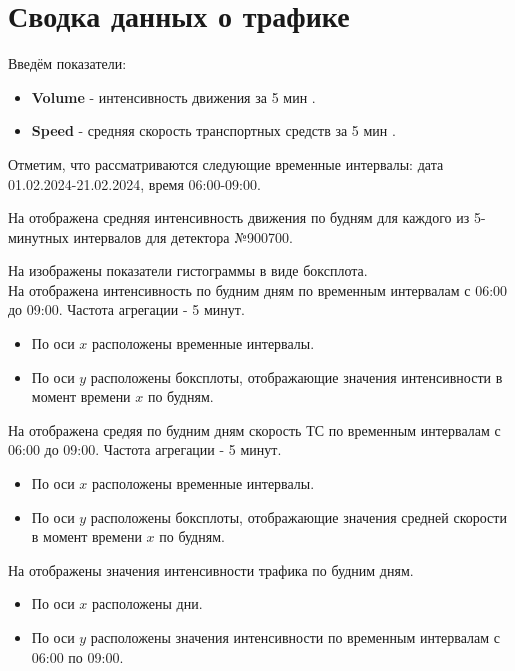\chapter{Сводка данных о трафике} \label{ch4}
Введём показатели:
\begin{itemize}
	\item \textbf{Volume} - интенсивность движения за 5 мин .
	\item \textbf{Speed} - средняя скорость транспортных средств за 5 мин .
\end{itemize}

Отметим, что рассматриваются следующие временные интервалы: дата 01.02.2024-21.02.2024, время 06:00-09:00.

На  отображена средняя интенсивность движения по будням для каждого из 5-минутных интервалов для детектора №900700.

На  изображены показатели гистограммы в виде боксплота.\\


\newpage
На  отображена интенсивность по будним дням по временным интервалам с 06:00 до 09:00. Частота агрегации - 5 минут.
\begin{itemize}
	\item По оси $x$ расположены временные интервалы.
	\item По оси $y$ расположены боксплоты, отображающие значения интенсивности в момент времени $x$ по будням.
\end{itemize}

На  отображена средяя по будним дням скорость ТС по временным интервалам с 06:00 до 09:00. Частота агрегации - 5 минут.
\begin{itemize}
	\item По оси $x$ расположены временные интервалы.
	\item По оси $y$ расположены боксплоты, отображающие значения средней скорости в момент времени $x$ по будням.
\end{itemize}

\newpage

На  отображены значения интенсивности трафика по будним дням.
\begin{itemize}
	\item По оси $x$ расположены дни.
	\item По оси $y$ расположены значения интенсивности по временным интервалам с 06:00 по 09:00.
\end{itemize}

